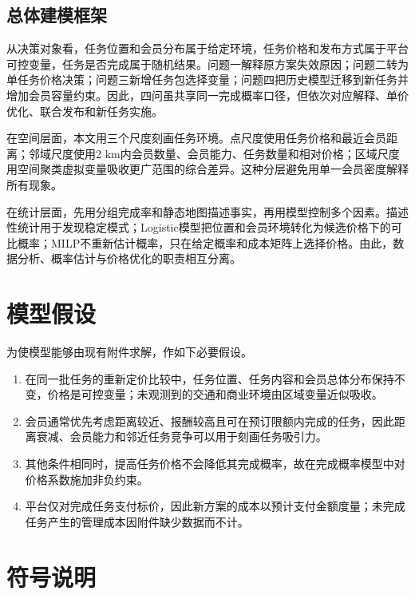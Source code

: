 ﻿\documentclass[UTF8,zihao=-4,a4paper,fontset=fandol]{ctexart}
\begin{document}
\subsection{总体建模框架}

从决策对象看，任务位置和会员分布属于给定环境，任务价格和发布方式属于平台可控变量，任务是否完成属于随机结果。问题一解释原方案失效原因；问题二转为单任务价格决策；问题三新增任务包选择变量；问题四把历史模型迁移到新任务并增加会员容量约束。因此，四问虽共享同一完成概率口径，但依次对应解释、单价优化、联合发布和新任务实施。

在空间层面，本文用三个尺度刻画任务环境。点尺度使用任务价格和最近会员距离；邻域尺度使用2 km内会员数量、会员能力、任务数量和相对价格；区域尺度用空间聚类虚拟变量吸收更广范围的综合差异。这种分层避免用单一会员密度解释所有现象。

在统计层面，先用分组完成率和静态地图描述事实，再用模型控制多个因素。描述性统计用于发现稳定模式；Logistic模型把位置和会员环境转化为候选价格下的可比概率；MILP不重新估计概率，只在给定概率和成本矩阵上选择价格。由此，数据分析、概率估计与价格优化的职责相互分离。

\section{模型假设}

为使模型能够由现有附件求解，作如下必要假设。

\begin{enumerate}[label=\arabic*)]
  \item 在同一批任务的重新定价比较中，任务位置、任务内容和会员总体分布保持不变，价格是可控变量；未观测到的交通和商业环境由区域变量近似吸收。
  \item 会员通常优先考虑距离较近、报酬较高且可在预订限额内完成的任务，因此距离衰减、会员能力和邻近任务竞争可以用于刻画任务吸引力。
  \item 其他条件相同时，提高任务价格不会降低其完成概率，故在完成概率模型中对价格系数施加非负约束。
  \item 平台仅对完成任务支付标价，因此新方案的成本以预计支付金额度量；未完成任务产生的管理成本因附件缺少数据而不计。
\end{enumerate}

\section{符号说明}
\end{document}
